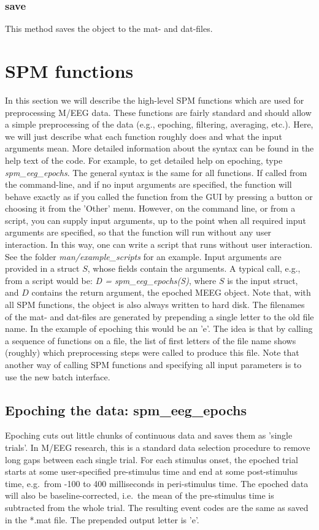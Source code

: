\subsubsection{save}
This method saves the object to the mat- and dat-files.


\section{SPM functions}
In this section we will describe the high-level SPM functions which
are used for preprocessing M/EEG data. These functions are fairly
standard and should allow a simple preprocessing of the data (e.g.,
epoching, filtering, averaging, etc.). Here, we will just describe
what each function roughly does and what the input arguments mean. More detailed information about the
syntax can be found in the help text of the code. For example, to get detailed help on epoching, type
\textit{spm\_eeg\_epochs}. The general syntax is the same for all
functions. If called from the command-line, and if no input arguments
are specified, the function will behave exactly as if you called the
function from the GUI by pressing a button or choosing it from the 'Other' menu. However, on the command line, or from a script,
you can supply input arguments, up to the point when all required input
arguments are specified, so that the function will run without any user
interaction. In this way, one can write a script that runs without
user interaction. See the folder \textit{man/example\_scripts} for an example. Input
arguments are provided in a struct $S$, whose 
fields contain the arguments. A typical call, e.g., from a script
would be: \textit{D = spm\_eeg\_epochs(S)}, where $S$ is the input
struct, and $D$ contains the return argument, the epoched MEEG object. Note that, with all SPM functions, the object is also always written to hard disk. The filenames of the mat- and dat-files are generated by prepending a single letter to the old file
name. In the example of epoching this would be an 'e'. The idea is that
by calling a sequence of functions on a file, the list of first
letters of the file name shows (roughly) which preprocessing steps were
called to produce this file. Note that another way of calling SPM
functions and specifying all input parameters is to use the new batch
interface.

\subsection{Epoching the data: spm\_eeg\_epochs}
Epoching cuts out little chunks of continuous data and saves them as
'single trials'. In M/EEG research, this is a standard data selection
procedure to remove long gaps between each single trial. For each
stimulus onset, the epoched trial starts at some user-specified
pre-stimulus time and 
end at some post-stimulus time, e.g.~from -100 to 400 milliseconds in
peri-stimulus time. The epoched data will also be baseline-corrected,
i.e.~the mean of the pre-stimulus time is subtracted from the whole
trial. The resulting event codes are the same as saved in the *.mat
file. The prepended output letter is 'e'.

